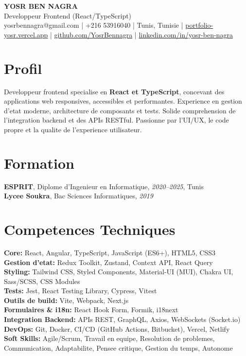 \documentclass[10pt,a4paper]{article}
\begin{document}
\begin{center}
  {\Large\bfseries YOSR BEN NAGRA}\\[2pt]
  {\small Developpeur Frontend (React/TypeScript)}\\[3pt]
  {\footnotesize yosrbennagra@gmail.com \;|\; +216 53916040 \;|\; Tunis, Tunisie \;|\; \href{https://portfolio-yosr.vercel.app/fr}{portfolio-yosr.vercel.app} \;|\; \href{https://github.com/YosrBennagra}{github.com/YosrBennagra} \;|\; \href{https://www.linkedin.com/in/yosr-ben-nagra/}{linkedin.com/in/yosr-ben-nagra}}
\end{center}

\section*{Profil}
{\small
Developpeur frontend specialise en \textbf{React et TypeScript}, concevant des applications web responsives, accessibles et performantes. Experience en gestion d'etat moderne, architecture de composants et tests. Solide comprehension de l'integration backend et des APIs RESTful. Passionne par l'UI/UX, le code propre et la qualite de l'experience utilisateur.
}

\vspace{4pt}

\section*{Formation}
{\small
\textbf{ESPRIT}, Diplome d'Ingenieur en Informatique, \textit{2020--2025}, Tunis\\[1pt]
\textbf{Lycee Soukra}, Bac Sciences Informatiques, \textit{2019}
}

\vspace{4pt}

\section*{Competences Techniques}
{\small
\textbf{Core:} React, Angular, TypeScript, JavaScript (ES6+), HTML5, CSS3\\[2pt]
\textbf{Gestion d'etat:} Redux Toolkit, Zustand, Context API, React Query\\[2pt]
\textbf{Styling:} Tailwind CSS, Styled Components, Material-UI (MUI), Chakra UI, Sass/SCSS, CSS Modules\\[2pt]
\textbf{Tests:} Jest, React Testing Library, Cypress, Vitest\\[2pt]
\textbf{Outils de build:} Vite, Webpack, Next.js\\[2pt]
\textbf{Formulaires \& i18n:} React Hook Form, Formik, i18next\\[2pt]
\textbf{Integration Backend:} APIs REST, GraphQL, Axios, WebSockets (Socket.io)\\[2pt]
\textbf{DevOps:} Git, Docker, CI/CD (GitHub Actions, Bitbucket), Vercel, Netlify\\[2pt]
\textbf{Soft Skills:} Agile/Scrum, Travail en equipe, Resolution de problemes, Communication, Adaptabilite, Pensee critique, Gestion du temps, Autonome
}
\end{document}
